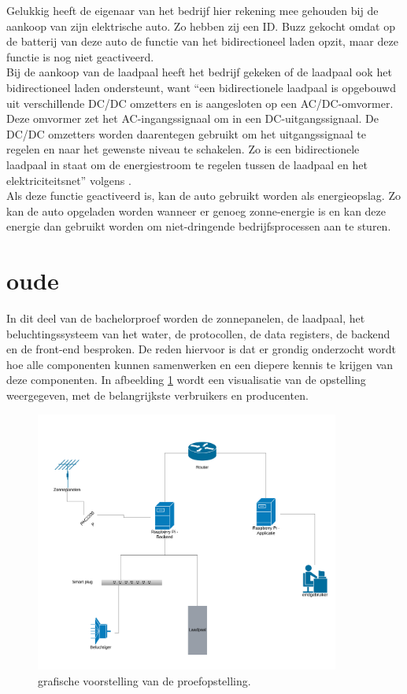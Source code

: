 Gelukkig heeft de eigenaar van het bedrijf hier rekening mee gehouden bij de aankoop van zijn elektrische auto. Zo hebben zij een ID. Buzz gekocht omdat op de batterij van deze auto de functie van het bidirectioneel laden opzit, maar deze functie is nog niet geactiveerd.\\

Bij de aankoop van de laadpaal heeft het bedrijf gekeken of de laadpaal ook het bidirectioneel laden ondersteunt, want “een bidirectionele laadpaal is opgebouwd uit verschillende DC/DC omzetters en is aangesloten op een AC/DC-omvormer. Deze omvormer zet het AC-ingangssignaal om in een DC-uitgangssignaal. De DC/DC omzetters worden daarentegen gebruikt om het uitgangssignaal te regelen en naar het gewenste niveau te schakelen. Zo is een bidirectionele laadpaal in staat om de energiestroom te regelen tussen de laadpaal en het elektriciteitsnet” volgens \textcite{Mohammadi2019}.\\

Als deze functie geactiveerd is, kan de auto gebruikt worden als energieopslag. Zo kan de auto opgeladen worden wanneer er genoeg zonne-energie is en kan deze energie dan gebruikt worden om niet-dringende bedrijfsprocessen aan te sturen.

\section{oude}
\label{sec:stand-van-zaken-oude}

In dit deel van de bachelorproef worden de zonnepanelen, de laadpaal, het beluchtingssysteem van het water, de protocollen, de data registers, de backend en de front-end besproken. De reden hiervoor is dat er grondig onderzocht wordt hoe alle componenten kunnen samenwerken en een diepere kennis te krijgen van deze componenten. In afbeelding \ref{fig:Netwedrkdiagram-Opstelling} wordt een visualisatie van de opstelling weergegeven, met de belangrijkste verbruikers en producenten.

\begin{figure}[h]
    \includegraphics[width=10cm]{./graphics/Netwerkdiagram-Opstelling.png}
    \caption{grafische voorstelling van de proefopstelling.}
    \label{fig:Netwedrkdiagram-Opstelling}
\end{figure}

